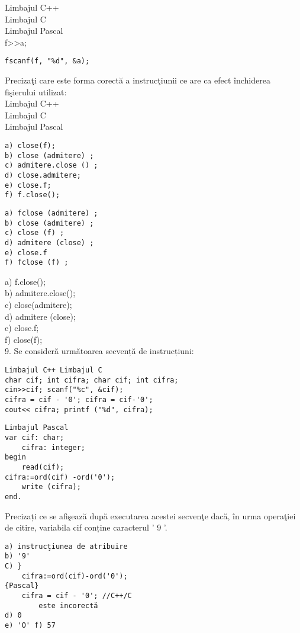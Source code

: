 Limbajul C++\\
Limbajul C\\
Limbajul Pascal\\
f>>a;

\begin{verbatim}
fscanf(f, "%d", &a);
\end{verbatim}

Precizaţi care este forma corectă a instrucţiunii ce are ca efect închiderea fişierului utilizat:\\
Limbajul C++\\
Limbajul C\\
Limbajul Pascal

\begin{verbatim}
a) close(f);
b) close (admitere) ;
c) admitere.close () ;
d) close.admitere;
e) close.f;
f) f.close();
\end{verbatim}

\begin{verbatim}
a) fclose (admitere) ;
b) close (admitere) ;
c) close (f) ;
d) admitere (close) ;
e) close.f
f) fclose (f) ;
\end{verbatim}

a) f.close();\\
b) admitere.close();\\
c) close(admitere);\\
d) admitere (close);\\
e) close.f;\\
f) close(f);\\
9. Se consideră următoarea secvență de instrucțiuni:

\begin{verbatim}
Limbajul C++ Limbajul C
char cif; int cifra; char cif; int cifra;
cin>>cif; scanf("%c", &cif);
cifra = cif - '0'; cifra = cif-'0';
cout<< cifra; printf ("%d", cifra);
\end{verbatim}

\begin{verbatim}
Limbajul Pascal
var cif: char;
    cifra: integer;
begin
    read(cif);
cifra:=ord(cif) -ord('0');
    write (cifra);
end.
\end{verbatim}

Precizați ce se afişează după executarea acestei secvenţe dacă, în urma operaţiei de citire, variabila cif conține caracterul ' 9 '.

\begin{verbatim}
a) instrucţiunea de atribuire
b) '9'
C) }
    cifra:=ord(cif)-ord('0');
{Pascal}
    cifra = cif - '0'; //C++/C
        este incorectă
d) 0
e) 'O' f) 57
\end{verbatim}


